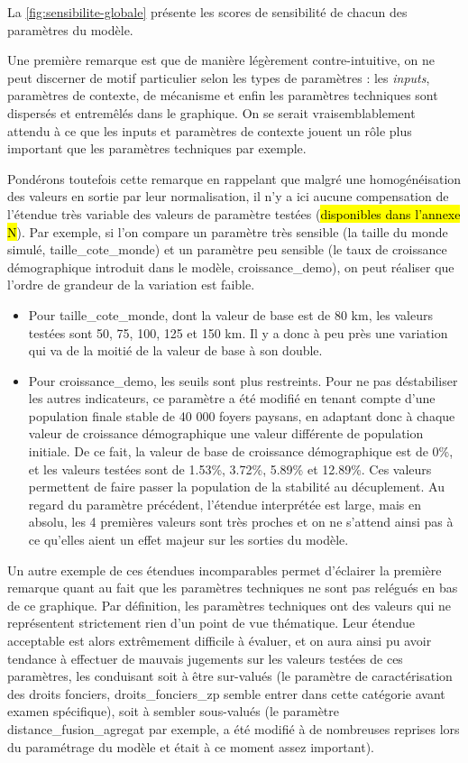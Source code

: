 La \cref{fig:sensibilite-globale} présente les \og scores de sensibilité\fg{} de chacun des paramètres du modèle.

Une première remarque est que de manière légèrement contre-intuitive, on ne peut discerner de motif particulier selon les types de paramètres : les \textit{inputs}, paramètres de contexte, de mécanisme et enfin les paramètres techniques sont dispersés et entremêlés dans le graphique.
On se serait vraisemblablement attendu à ce que les inputs et paramètres de contexte jouent un rôle plus important que les paramètres techniques par exemple.

Pondérons toutefois cette remarque en rappelant que malgré une homogénéisation des valeurs en sortie par leur normalisation, il n'y a ici aucune compensation de l'étendue très variable des valeurs de paramètre testées (\hl{disponibles dans l'annexe N}).
Par exemple, si l'on compare un paramètre très sensible (la taille du monde simulé, \textsf{taille\_cote\_monde}) et un paramètre peu sensible (le taux de croissance démographique introduit dans le modèle, \textsf{croissance\_demo}), on peut réaliser que l'ordre de grandeur de la variation est faible.
\begin{itemize}[noitemsep,nolistsep]\vspace*{-.5em}
	\item Pour \textsf{taille\_cote\_monde}, dont la valeur de base est de 80 km, les valeurs testées sont 50, 75, 100, 125 et 150 km.
	Il y a donc à peu près une variation qui va de la moitié de la valeur de base à son double.
	\item Pour \textsf{croissance\_demo}, les seuils sont plus restreints.
	Pour ne pas déstabiliser les autres indicateurs, ce paramètre a été modifié en tenant compte d'une population finale stable de 40 000 foyers paysans, en adaptant donc à chaque valeur de croissance démographique une valeur différente de population initiale.
	De ce fait, la valeur de base de croissance démographique est de 0\%, et les valeurs testées sont de 1.53\%, 3.72\%, 5.89\% et 12.89\%.
	Ces valeurs permettent de faire passer la population de la stabilité au décuplement. Au regard du paramètre précédent, l'étendue interprétée est large, mais en absolu, les 4 premières valeurs sont très proches et on ne s'attend ainsi pas à ce qu'elles aient un effet majeur sur les sorties du modèle.
\end{itemize}

Un autre exemple de ces étendues incomparables permet d'éclairer la première remarque quant au fait que les paramètres techniques ne sont pas relégués en bas de ce graphique.
Par définition, les paramètres techniques ont des valeurs qui ne représentent strictement rien d'un point de vue thématique.
Leur étendue acceptable est alors extrêmement difficile à évaluer, et on aura ainsi pu avoir tendance à effectuer de mauvais jugements sur les valeurs testées de ces paramètres, les conduisant soit à être sur-valués (le paramètre de caractérisation des droits fonciers, \textsf{droits\_fonciers\_zp} semble entrer dans cette catégorie avant examen spécifique), soit à sembler sous-valués (le paramètre \textsf{distance\_fusion\_agregat} par exemple, a été modifié à de nombreuses reprises lors du paramétrage du modèle et était à ce moment assez important).


